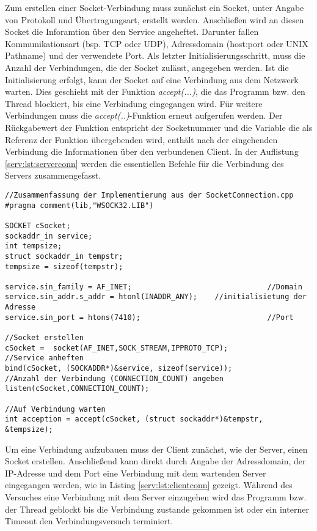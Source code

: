 Zum erstellen einer Socket-Verbindung muss zunächst ein Socket, unter Angabe von Protokoll und Übertragungsart, erstellt werden. Anschließen wird an diesen Socket die Inforamtion über den Service angeheftet. Darunter fallen Kommunikationsart (bsp. TCP oder UDP), Adressdomain (host:port oder UNIX Pathname) und der verwendete Port. Als letzter Initialisierungsschritt, muss die Anzahl der Verbindungen, die der Socket zulässt, angegeben werden. Ist die Initialisierung erfolgt, kann der Socket auf eine Verbindung aus dem Netzwerk warten. Dies geschieht mit der Funktion {\it accept(...)}, die das Programm bzw. den Thread blockiert, bis eine Verbindung eingegangen wird. Für weitere Verbindungen muss die {\it accept(..)}-Funktion erneut aufgerufen werden. Der Rückgabewert der Funktion entspricht der Socketnummer und die Variable die als Referenz der Funktion übergebenden wird, enthält nach der eingehenden Verbindung die Informationen über den verbundenen Client. In der Auflistung \ref{serv:lst:serverconn} werden die essentiellen Befehle für die Verbindung des Servers zusammengefasst.

\begin{lstlisting}[frame=tb,captionpos=b,caption=Socket Connection - Server., label=serv:lst:serverconn]
//Zusammenfassung der Implementierung aus der SocketConnection.cpp
#pragma comment(lib,"WSOCK32.LIB")

SOCKET cSocket;
sockaddr_in service;
int tempsize;
struct sockaddr_in tempstr;
tempsize = sizeof(tempstr);	

service.sin_family = AF_INET; 								//Domain								
service.sin_addr.s_addr = htonl(INADDR_ANY);	//initialisietung der Adresse
service.sin_port = htons(7410);								//Port

//Socket erstellen
cSocket =  socket(AF_INET,SOCK_STREAM,IPPROTO_TCP); 			
//Service anheften
bind(cSocket, (SOCKADDR*)&service, sizeof(service)); 
//Anzahl der Verbindung (CONNECTION_COUNT) angeben
listen(cSocket,CONNECTION_COUNT);														

//Auf Verbindung warten
int acception = accept(cSocket, (struct sockaddr*)&tempstr, &tempsize); 

\end{lstlisting}

Um eine Verbindung aufzubauen muss der Client zunächst, wie der Server, einen Socket erstellen. Anschließend kann direkt durch Angabe der Adressdomain, der IP-Adresse und dem Port eine Verbindung mit dem wartenden Server eingegangen werden, wie in Listing \ref{serv:lst:clientconn} gezeigt. Während des Versuches eine Verbindung mit dem Server einzugehen wird das Programm bzw. der Thread geblockt bis die Verbindung zustande gekommen ist oder ein interner Timeout den Verbindungsversuch terminiert.

